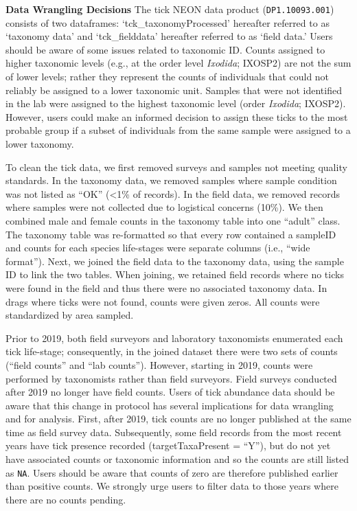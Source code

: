 \documentclass[
  12pt,
]{article}
\begin{document}
\textbf{Data Wrangling Decisions} The tick NEON data product (\texttt{DP1.10093.001}) consists of two dataframes: `tck\_taxonomyProcessed' hereafter referred to as `taxonomy data' and `tck\_fielddata' hereafter referred to as `field data.' Users should be aware of some issues related to taxonomic ID. Counts assigned to higher taxonomic levels (e.g., at the order level \emph{Ixodida}; IXOSP2) are not the sum of lower levels; rather they represent the counts of individuals that could not reliably be assigned to a lower taxonomic unit. Samples that were not identified in the lab were assigned to the highest taxonomic level (order \emph{Ixodida}; IXOSP2). However, users could make an informed decision to assign these ticks to the most probable group if a subset of individuals from the same sample were assigned to a lower taxonomy.

To clean the tick data, we first removed surveys and samples not meeting quality standards. In the taxonomy data, we removed samples where sample condition was not listed as ``OK'' (\textless1\% of records). In the field data, we removed records where samples were not collected due to logistical concerns (10\%). We then combined male and female counts in the taxonomy table into one ``adult'' class. The taxonomy table was re-formatted so that every row contained a sampleID and counts for each species life-stages were separate columns (i.e., ``wide format''). Next, we joined the field data to the taxonomy data, using the sample ID to link the two tables. When joining, we retained field records where no ticks were found in the field and thus there were no associated taxonomy data. In drags where ticks were not found, counts were given zeros. All counts were standardized by area sampled.

Prior to 2019, both field surveyors and laboratory taxonomists enumerated each tick life-stage; consequently, in the joined dataset there were two sets of counts (``field counts'' and ``lab counts''). However, starting in 2019, counts were performed by taxonomists rather than field surveyors. Field surveys conducted after 2019 no longer have field counts. Users of tick abundance data should be aware that this change in protocol has several implications for data wrangling and for analysis. First, after 2019, tick counts are no longer published at the same time as field survey data. Subsequently, some field records from the most recent years have tick presence recorded (targetTaxaPresent = ``Y''), but do not yet have associated counts or taxonomic information and so the counts are still listed as \texttt{NA}. Users should be aware that counts of zero are therefore published earlier than positive counts. We strongly urge users to filter data to those years where there are no counts pending.
\end{document}
